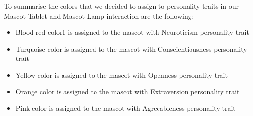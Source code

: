 \par To summarise the colors that we decided to assign to personality traits in our Mascot-Tablet and Mascot-Lamp interaction are the following:
\begin{itemize}
\item Blood-red color1 is assigned to the mascot with Neuroticism personality trait
\item Turquoise color is assigned to the mascot with Conscientiousness personality trait
\item Yellow color is assigned to the mascot with Openness personality trait
\item Orange color is assigned to the mascot with Extraversion personality trait
\item Pink color is assigned to the mascot with Agreeableness personality trait
\end{itemize}